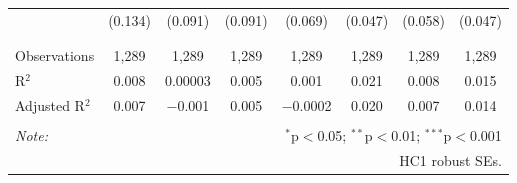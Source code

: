 \begin{table}[!htbp]
\begin{tabular}{@{\extracolsep{5pt}}lccccccc}
  & (0.134) & (0.091) & (0.091) & (0.069) & (0.047) & (0.058) & (0.047) \\ 
  & & & & & & & \\ 
\hline \\[-1.8ex] 
Observations & 1,289 & 1,289 & 1,289 & 1,289 & 1,289 & 1,289 & 1,289 \\ 
R$^{2}$ & 0.008 & 0.00003 & 0.005 & 0.001 & 0.021 & 0.008 & 0.015 \\ 
Adjusted R$^{2}$ & 0.007 & $-$0.001 & 0.005 & $-$0.0002 & 0.020 & 0.007 & 0.014 \\ 
\hline 
\hline \\[-1.8ex] 
\textit{Note:}  & \multicolumn{7}{r}{$^{*}$p$<$0.05; $^{**}$p$<$0.01; $^{***}$p$<$0.001} \\ 
 & \multicolumn{7}{r}{HC1 robust SEs.} \\ 
\end{tabular} 
\end{table} 
